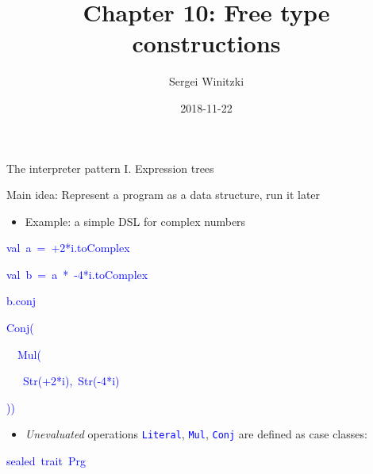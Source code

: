 \documentclass[english,,russian]{beamer}
\title[Chapter 10: Free type constructions]{Chapter 10: Free type constructions}
\author{Sergei Winitzki}
\date{2018-11-22}
\institute[ABTB]{Academy by the Bay}
\newenvironment{lyxcode}
  {\par\begin{list}{}{
    \setlength{\rightmargin}{\leftmargin}
    \setlength{\listparindent}{0pt}%
    \raggedright
    \setlength{\itemsep}{0pt}
    \setlength{\parsep}{0pt}
    \normalfont\ttfamily}%
   \def\{{\char`\{}
   \def\}{\char`\}}
   \def\textasciitilde{\char`\~}
   \item[]}
  {\end{list}}
\begin{document}
\frame{\titlepage}
\begin{frame}{The interpreter pattern I. Expression trees}

Main idea: Represent a program as a data structure, run it later
\begin{itemize}
\item Example: a simple DSL for complex numbers
\end{itemize}
\vspace{-0.35cm}%
\begin{minipage}[t]{0.35\columnwidth}%
\begin{lyxcode}
\textcolor{blue}{\footnotesize{}val~a~=~+2{*}i\textquotedbl .toComplex}{\footnotesize\par}

\textcolor{blue}{\footnotesize{}val~b~=~a~{*}~-4{*}i\textquotedbl .toComplex}{\footnotesize\par}

\textcolor{blue}{\footnotesize{}b.conj}{\footnotesize\par}
\end{lyxcode}
%
\end{minipage}\hspace*{\fill}%
\begin{minipage}[t]{0.45\columnwidth}%
\begin{lyxcode}
\textcolor{blue}{\footnotesize{}Conj(}{\footnotesize\par}

\textcolor{blue}{\footnotesize{}~~Mul(}{\footnotesize\par}

\textcolor{blue}{\footnotesize{}~~~Str(+2{*}i\textquotedbl ),~Str(-4{*}i\textquotedbl )}{\footnotesize\par}

\textcolor{blue}{\footnotesize{}))}{\footnotesize\par}
\end{lyxcode}
%
\end{minipage}\hspace*{\fill}
\begin{itemize}
\item \emph{Unevaluated} operations \texttt{\textcolor{blue}{\footnotesize{}Literal}},
\texttt{\textcolor{blue}{\footnotesize{}Mul}}, \texttt{\textcolor{blue}{\footnotesize{}Conj}}
are defined as case classes:
\end{itemize}
\begin{lyxcode}
\textcolor{blue}{\footnotesize{}sealed~trait~Prg}{\footnotesize\par}


\end{lyxcode}
\end{frame}
\end{document}
